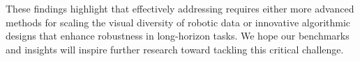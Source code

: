 These findings highlight that effectively addressing \pb requires either more advanced methods for scaling the visual diversity of robotic data or innovative algorithmic designs that enhance robustness in long-horizon tasks. We hope our benchmarks and insights will inspire further research toward tackling this critical challenge.

